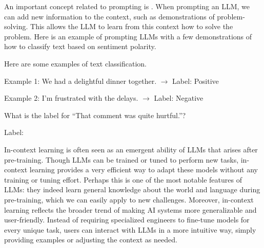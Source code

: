 An important concept related to prompting is . When prompting an LLM, we can add new information to the context, such as demonstrations of problem-solving. This allows the LLM to learn from this context how to solve the problem. Here is an example of prompting LLMs with a few demonstrations of how to classify text based on sentiment polarity.

\vspace{0.5em}
\begin{tcolorbox}
\hspace{2em} Here are some examples of text classification.

\vspace{0.3em}

\hspace{2em} Example 1: We had a delightful dinner together. $\to$ Label: Positive

\vspace{0.2em}

\hspace{2em} Example 2: I'm frustrated with the delays. $\to$ Label: Negative

\vspace{0.3em}

\hspace{2em} What is the label for ``That comment was quite hurtful.''?

\vspace{0.2em}

\hspace{2em} Label: \underline{\hspace{2em}}
\end{tcolorbox}
\vspace{0.5em}

In-context learning is often seen as an emergent ability of LLMs that arises after pre-training. Though LLMs can be trained or tuned to perform new tasks, in-context learning provides a very efficient way to adapt these models without any training or tuning effort. Perhaps this is one of the most notable features of LLMs: they indeed learn general knowledge about the world and language during pre-training, which we can easily apply to new challenges. Moreover, in-context learning reflects the broader trend of making AI systems more generalizable and user-friendly. Instead of requiring specialized engineers to fine-tune models for every unique task, users can interact with LLMs in a more intuitive way, simply providing examples or adjusting the context as needed.

